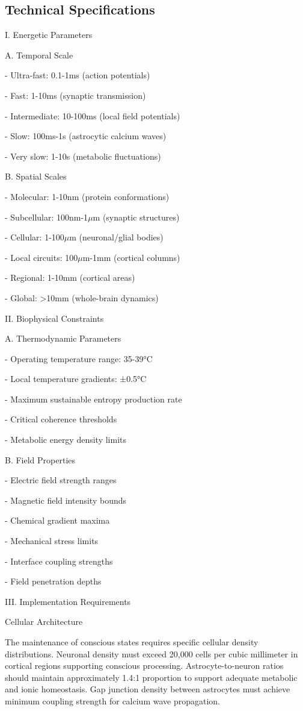 \begin{refsection}
\newpage

\section{Technical Specifications}

I. Energetic Parameters

A. Temporal Scale

- Ultra-fast: 0.1-1ms (action potentials)

- Fast: 1-10ms (synaptic transmission)

- Intermediate: 10-100ms (local field potentials)

- Slow: 100ms-1s (astrocytic calcium waves)

- Very slow: 1-10s (metabolic fluctuations)

B. Spatial Scales

- Molecular: 1-10nm (protein conformations)

- Subcellular: 100nm-1$\mu$m (synaptic structures)

- Cellular: 1-100$\mu$m (neuronal/glial bodies)

- Local circuits: 100$\mu$m-1mm (cortical columns)

- Regional: 1-10mm (cortical areas)

- Global: >10mm (whole-brain dynamics)

II. Biophysical Constraints

A. Thermodynamic Parameters

- Operating temperature range: 35-39°C

- Local temperature gradients: ±0.5°C

- Maximum sustainable entropy production rate

- Critical coherence thresholds

- Metabolic energy density limits

B. Field Properties

- Electric field strength ranges

- Magnetic field intensity bounds

- Chemical gradient maxima

- Mechanical stress limits

- Interface coupling strengths

- Field penetration depths

III. Implementation Requirements

Cellular Architecture

The maintenance of conscious states requires specific cellular density distributions. Neuronal density must exceed 20,000 cells per cubic millimeter in cortical regions supporting conscious processing. Astrocyte-to-neuron ratios should maintain approximately 1.4:1 proportion to support adequate metabolic and ionic homeostasis. Gap junction density between astrocytes must achieve minimum coupling strength for calcium wave propagation.


\end{refsection}

